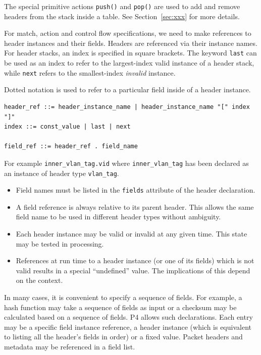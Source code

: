 \documentclass[12pt]{article}
\begin{document}
The special primitive actions \texttt{push()} and \texttt{pop()} are used to add 
and remove headers from the stack inside a \matchaction table. See Section~\ref{sec:xxx} 
for more details.


For match, action and control flow specifications, we need to make
references to header instances and their fields. Headers are
referenced via their instance names.  For header stacks, an index is
specified in square brackets. The keyword \texttt{last} can be used as an
index to refer to the largest-index valid instance of a header stack, while
\texttt{next} refers to the smallest-index \textit{invalid} instance.

Dotted notation is used to refer to a particular field inside of a header
instance. 

\begin{lstlisting}[style=BNFstyle]
header_ref ::= header_instance_name | header_instance_name "[" index "]"
index ::= const_value | last | next

field_ref ::= header_ref . field_name
\end{lstlisting}

For example \texttt{inner_vlan_tag.vid} where
\texttt{inner_vlan_tag} has been declared as an instance of header
type \texttt{vlan_tag}.

\begin{itemize}
\item
Field names must be listed in the \texttt{fields} attribute of the
header declaration.
\item
A field reference is always relative to its parent header.  This allows the 
same field name to be used in different header types without ambiguity.
\item
Each header instance may be valid or invalid at any given time. This state 
may be tested in \matchaction processing.
\item
References at run time to a header instance (or one of its fields) which is 
not valid results in a special ``undefined'' value.  The implications of this 
depend on the context.
\end{itemize}


In many cases, it is convenient to specify a sequence of fields. For example, 
a hash function may take a sequence of fields as input or a checksum may be 
calculated based on a sequence of fields.  P4 allows such declarations. Each 
entry may be a specific field instance reference, a header instance (which 
is equivalent to listing all the header's fields in order) or a fixed value. 
Packet headers and metadata may be referenced in a field list.
\end{document}
